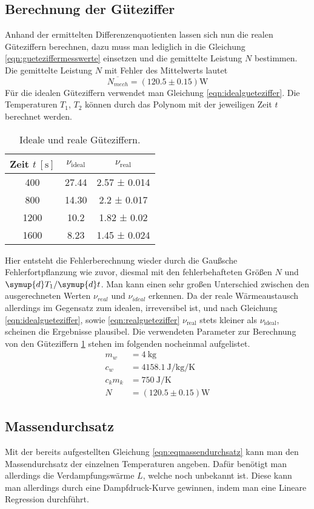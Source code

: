 \subsection{Berechnung der Güteziffer}
Anhand der ermittelten Differenzenquotienten lassen sich nun die realen Güteziffern berechnen, dazu muss man lediglich in die Gleichung \eqref{eqn:gueteziffermesswerte} einsetzen und die
gemittelte Leistung $N$ bestimmen.
Die gemittelte Leistung $N$ mit Fehler des Mittelwerts lautet
\begin{equation}
\overline{N_{mech}} = (120.5 \pm 0.15) \text{W}
\end{equation}
Für die idealen Güteziffern verwendet man Gleichung \eqref{eqn:idealgueteziffer}. Die Temperaturen $T_{1}$, $T_{2}$ können durch das Polynom mit der jeweiligen Zeit $t$ berechnet werden.
\begin{table}
  \centering
  \caption{Ideale und reale Güteziffern.}
  \label{tab:gueteziffernidealundreal}
  \begin{tabular}{c c c}
    \toprule
    Zeit {$t \: [\si{\second}]$} & {$\nu_\text{ideal}$} & {$\nu_\text{real}$} \\
    \midrule
    400  & 27.44 & 2.57 ± 0.014 \\
    800  & 14.30 & 2.2 ± 0.017 \\
    1200  &  10.2 & 1.82 ± 0.02 \\
    1600 &  8.23 & 1.45 ± 0.024\\
    \bottomrule
  \end{tabular}
\end{table}
Hier entsteht die Fehlerberechnung wieder durch die Gaußsche Fehlerfortpflanzung wie zuvor, diesmal mit den fehlerbehafteten Größen $N$ und ${\symup{d}T_{1}}/{\symup{d}t}$.
Man kann einen sehr großen Unterschied zwischen den ausgerechneten Werten $\nu_{real}$ und $\nu_{ideal}$ erkennen. Da der reale Wärmeaustausch allerdings im Gegensatz zum idealen, irreversibel ist,
und nach Gleichung \eqref{eqn:idealgueteziffer}, sowie \eqref{eqn:realgueteziffer} $\nu_{\text{real}}$ stets kleiner als $\nu_{\text{ideal}}$, scheinen die Ergebnisse plausibel.
Die verwendeten Parameter zur Berechnung von den Güteziffern \ref{tab:gueteziffernidealundreal} stehen im folgenden nocheinmal aufgelistet.
\begin{align}
m_{w} &= \SI{4}{\kilo\gram} \\
c_{w} &= \SI{4158.1}{\joule\per\kilo\gram\per\kelvin}\\
c_{k}m_{k} &= \SI{750}{\joule\per\kelvin}\\
N &= (120.5 \pm 0.15) \text{W}
\end{align}
\subsection{Massendurchsatz}
Mit der bereits aufgestellten Gleichung \eqref{eqn:eqmassendurchsatz} kann man den Massendurchsatz der einzelnen Temperaturen angeben.
Dafür benötigt man allerdings die Verdampfungswärme $L$, welche noch unbekannt ist. Diese kann man allerdings durch eine Dampfdruck-Kurve gewinnen, indem man eine Lineare Regression durchführt.

